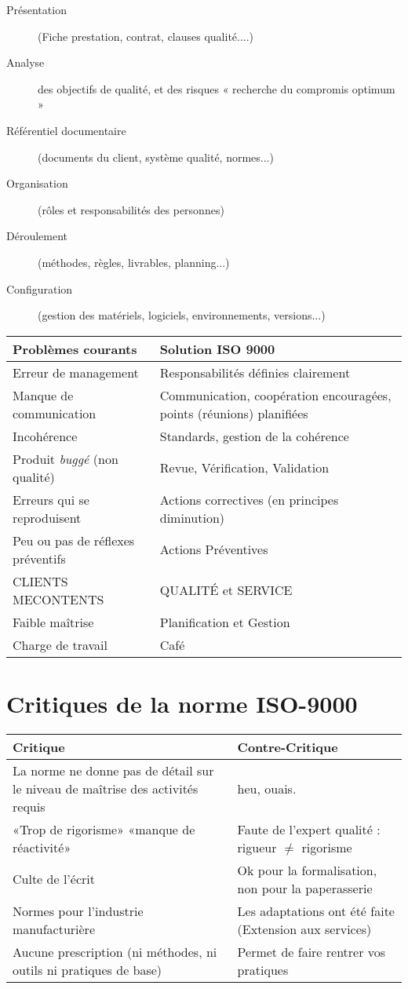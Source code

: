 \begin{description}
	\item[Présentation] (Fiche prestation, contrat, clauses qualité....)
	\item[Analyse] des objectifs de qualité, et des risques « recherche du compromis optimum »
	\item[Référentiel documentaire] (documents du client, système qualité, normes...)
	\item[Organisation] (rôles et responsabilités des personnes)
	\item[Déroulement] (méthodes, règles, livrables, planning...)
	\item[Configuration] (gestion des matériels, logiciels, environnements, versions...)
\end{description}

\begin{tabular}{|p{7cm}|p{7cm}|}
	\hline
	Problèmes courants & Solution ISO 9000 \\
	\hline
	\hline
	Erreur de management & Responsabilités définies clairement \\
	\hline
	Manque de communication & Communication, coopération
	encouragées, points (réunions) planifiées\\
	\hline
	Incohérence & Standards, gestion de la cohérence \\
	\hline
	Produit \textsl{buggé} (non qualité) & Revue, Vérification, Validation\\
	\hline
	Erreurs qui se reproduisent & Actions correctives (en principes diminution)\\
	\hline
	Peu ou pas de réflexes préventifs & Actions Préventives\\
	\hline
	CLIENTS MECONTENTS & QUALITÉ et SERVICE\\
	\hline
	Faible maîtrise & Planification et Gestion\\
	\hline
	Charge de travail & Café \\
    \hline
\end{tabular}


\section{Critiques de la norme ISO-9000}
\begin{tabular}{|p{7cm}|p{7cm}|}
	\hline
	Critique & Contre-Critique\\
	\hline
	\hline
	La norme ne donne pas de détail sur le niveau de maîtrise des activités requis & heu, ouais.\\
	\hline
	«Trop de rigorisme» «manque de réactivité» & Faute de l’expert qualité : rigueur $\neq$ rigorisme \\
	\hline
	Culte de l’écrit & Ok pour la formalisation, non pour la paperasserie\\
	\hline
	Normes pour l'industrie manufacturière & Les adaptations ont été faite (Extension aux services)\\
	\hline
	Aucune prescription (ni méthodes, ni outils ni pratiques de base) & Permet de faire rentrer vos pratiques\\
\hline
\end{tabular}



